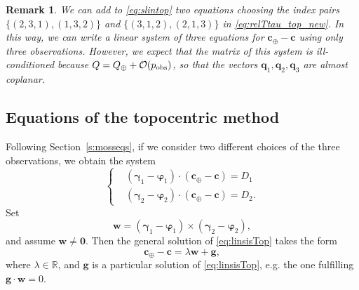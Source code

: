 \documentclass[11pt]{article}
\def\angmom{\bm{c}}
\def\bq{\bm{q}}
\def\angmom{{\bm{c}}}
\def\obs{{\rm obs}}
\def\obs{{\rm obs}}
\newtheorem{remark}{\bf Remark}
\begin{document}
\begin{remark}
    We can add to \eqref{eq:slintop} two equations choosing the index pairs $\{(2,3,1),(1,3,2)\}$ and $\{(3,1,2),(2,1,3)\}$ in     \eqref{eq:relTtau_top_new}.  
    In this way, we can write a linear system of three equations for $\angmom_\oplus-\angmom$ using only three observations. 
    However, we expect that the matrix of this system is ill-conditioned because $Q = Q_\oplus + \mathcal{O}(p_\obs)$, so that the vectors $\bq_1, \bq_2, \bq_3$ are almost coplanar.
\end{remark}



\subsection{Equations of the topocentric method}
\label{s:top}

Following Section~\ref{s:mosseqs}, if we consider two different choices of the three observations, we obtain the system
\begin{equation}
    \left\{
    \begin{aligned}
        &(\bm{\gamma}_1-\bm{\varphi}_1)\cdot\left(\bm{c}_\oplus-\bm{c}\right) = D_1\\
        &(\bm{\gamma}_2-\bm{\varphi}_2)\cdot\left(\bm{c}_\oplus-\bm{c}\right) = D_2.
    \end{aligned}
    \right.
\label{eq:linsisTop}
\end{equation}
%
Set
\begin{equation*}
    \bm{w} = (\bm{\gamma}_1-\bm{\varphi}_1)\times(\bm{\gamma}_2-\bm{\varphi}_2),
\end{equation*}
and assume $\bm{w}\neq\bm{0}$.
Then the general solution of \eqref{eq:linsisTop} takes the form
%
\begin{equation}
    \bm{c}_\oplus - \bm{c} = \lambda\bm{w} + \bm{g},
\label{gensol_top}
\end{equation}
where $\lambda\in\mathbb{R}$, and $\bm{g}$ is a particular solution of \eqref{eq:linsisTop}, e.g. the one fulfilling $\bm{g}\cdot\bm{w}=0$. 
\end{document}
